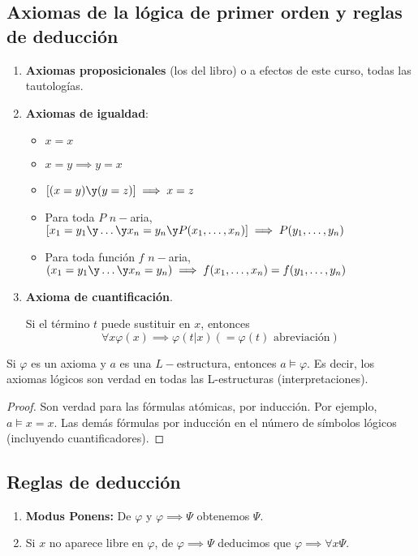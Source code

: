 \subsection{Axiomas de la lógica de primer orden y reglas de deducción}

\begin{enumerate}
	\item \textbf{Axiomas proposicionales} (los del libro) o a efectos de este curso, todas las tautologías.
	\item \textbf{Axiomas de igualdad}:
	\begin{itemize}
		\item $x=x$
		\item $x=y \implies y=x$
		\item $\left[(x=y)\y(y=z)\right]\implies x=z$
		\item Para toda $P$ $n-$aria, $\left[x_1=y_1\y \hdots\y x_n=y_n \y P(x_1, \hdots, x_n)\right] \implies P(y_1, \hdots, y_n)$
		\item Para toda función $f$ $n-$aria, $(x_1=y_1\y \hdots \y x_n=y_n)\implies f(x_1, \hdots, x_n) = f(y_1, \hdots, y_n)$
	\end{itemize}
	\item \textbf{Axioma de cuantificación}.

	Si el término $t$ puede sustituir en $x$, entonces
	$$\forall x\varphi(x) \implies \varphi (t|x) (= \varphi(t) \text{ abreviación})$$
\end{enumerate}

\begin{theorem}
	Si $\varphi$ es un axioma y $a$ es una $L-$estructura, entonces $a\vDash \varphi$.
	Es decir, los axiomas lógicos son verdad en todas las L-estructuras (interpretaciones).
\end{theorem}
\begin{proof}
	Son verdad para las fórmulas atómicas, por inducción.
	Por ejemplo, $a\vDash x=x$. Las demás fórmulas por inducción en el número de símbolos lógicos (incluyendo cuantificadores).
\end{proof}

\subsection{Reglas de deducción}
\begin{enumerate}
	\item \textbf{Modus Ponens:} De $\varphi$ y $\varphi\implies \Psi$ obtenemos $\Psi$.
	\item Si $x$ no aparece libre en $\varphi$, de $\varphi \implies \Psi$ deducimos que $\varphi\implies \forall x \Psi$.
\end{enumerate}

